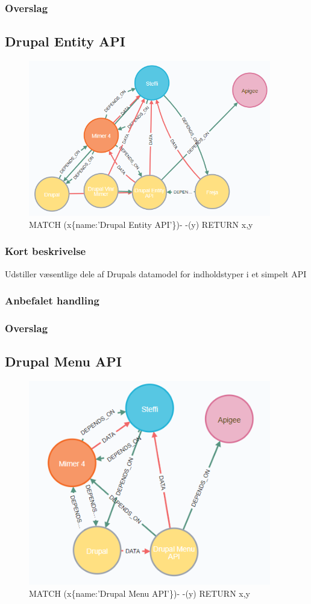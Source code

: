 \documentclass{article}
\begin{document}
\subsubsection{Overslag}


\subsection{Drupal Entity API}
\begin{figure}[h]
\includegraphics[width=300pt]{DrupalEntityAPI.PNG}
\caption{MATCH (x\{name:'Drupal Entity API'\})- -(y) RETURN x,y}
\end{figure}
\subsubsection{Kort beskrivelse}
Udstiller væsentlige dele af Drupals datamodel for indholdstyper i et simpelt API
\subsubsection{Anbefalet handling}
\subsubsection{Overslag}



\subsection{Drupal Menu API}
\begin{figure}[h]
\includegraphics[width=300pt]{DrupalMenuAPI.PNG}
\caption{MATCH (x\{name:'Drupal Menu API'\})- -(y) RETURN x,y}
\end{figure}
\end{document}
